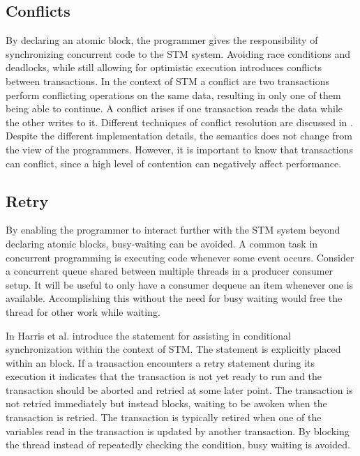 \subsection{Conflicts}
By declaring an atomic block, the programmer gives the responsibility of synchronizing concurrent code to the \ac{STM} system. Avoiding race conditions and deadlocks, while still allowing for optimistic execution introduces conflicts between transactions. In the context of \ac{STM} a conflict are two transactions perform conflicting operations on the same data, resulting in only one of them being able to continue\cite[p. 20]{harris2010transactional}. A conflict arises if one transaction reads the data while the other writes to it. Different techniques of conflict resolution are discussed in \cite[p. 45-46 \& 52-55]{dpt907e14trending}. Despite the different implementation details, the semantics does not change from the view of the programmers. However, it is important to know that transactions can conflict, since a high level of contention can negatively affect performance\cite[p. 52]{dpt907e14trending}.

\subsection{Retry}
By enabling the programmer to interact further with the \ac{STM} system beyond declaring atomic blocks, busy-waiting can be avoided. A common task in concurrent programming is executing code whenever some event occurs. Consider a concurrent queue shared between multiple threads in a producer consumer setup. It will be useful to only have a consumer dequeue an item whenever one is available. Accomplishing this without the need for busy waiting would free the thread for other work while waiting.

In \cite{harris2005composable} Harris et al. introduce the  statement for assisting in conditional synchronization within the context of \ac{STM}. The  statement is explicitly placed within an  block. If a transaction encounters a retry statement during its execution it indicates that the transaction is not yet ready to run and the transaction should be aborted and retried at some later point\cite[p. 73]{harris2010transactional}. The transaction is not retried immediately but instead blocks, waiting to be awoken when the transaction is retried. The transaction is typically retired when one of the variables read in the transaction is updated by another transaction\cite[p. 51]{harris2005composable}. By blocking the thread instead of repeatedly checking the condition, busy waiting is avoided.

